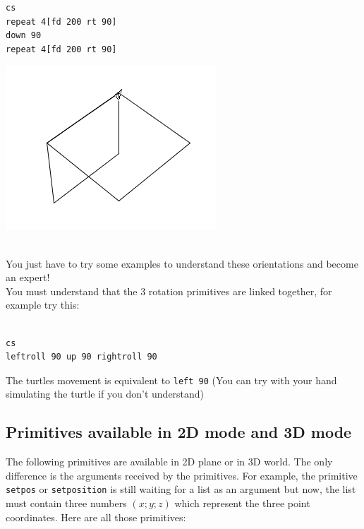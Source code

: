 \begin{minipage}{7cm}
\begin{verbatim}
cs
repeat 4[fd 200 rt 90]
down 90
repeat 4[fd 200 rt 90]
\end{verbatim}
\end{minipage}
\begin{minipage}{10cm}
\begin{center}
\includegraphics*[scale=0.4]{pics/perspective1.png}
\end{center}
\end{minipage}
\\
You just have to try some examples to understand these orientations and become an expert!\\
You must understand that the 3 rotation primitives are linked together, for example try this:\\ \\
\begin{minipage}{7cm}
\begin{verbatim}
cs
leftroll 90 up 90 rightroll 90
\end{verbatim}
\end{minipage}
\hspace{3cm}
\begin{minipage}{7cm}
\begin{center}
The turtles movement is equivalent to \texttt{left~90} (You can try with your hand simulating the turtle if you don't understand)
\end{center}
\end{minipage}
\subsection{Primitives available in 2D mode and 3D mode}
The following primitives are available in 2D plane or in 3D world. The only difference is the arguments received by the primitives. For example, the primitive \texttt{setpos} or \texttt{setposition} is still waiting for a list as an argument but now, the list must contain three numbers $(x;y;z)$ which represent the three point coordinates. Here are all those primitives:\\ \\

